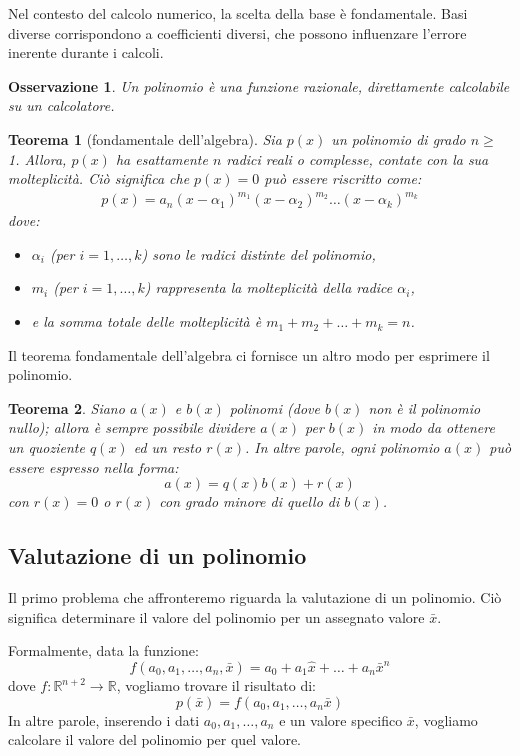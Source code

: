 \documentclass{article}
\newtheorem*{theorem}{\color{green}\textbf{Teorema}}
\newtheorem*{oss}{Osservazione}
\numberwithin{equation}{section}
\begin{document}
Nel contesto del calcolo numerico, la scelta della base è fondamentale. Basi
diverse corrispondono a coefficienti diversi, che possono influenzare l'errore
inerente durante i calcoli.
\begin{oss}
    Un polinomio è una funzione razionale, direttamente calcolabile su un
    calcolatore.
\end{oss}
\begin{theorem}[fondamentale dell'algebra]
    Sia $p(x)$ un polinomio di grado $n  \geq$ 1. Allora, $p(x)$ ha 
    esattamente $n$ radici reali o complesse, contate con la sua
    molteplicità. Ciò significa che $p(x)=0$ può essere riscritto come:
    \begin{equation}
        \begin{aligned} \label{eq:teorema_divisione_polinomi}
           p(x)=a_n(x-\alpha_1)^{m_1}(x-\alpha_2)^{m_2}\ldots(x-\alpha_k)^{m_k}
       \end{aligned} 
    \end{equation}
    dove:
    \begin{itemize}
        \item $\alpha_i$ (per $i=1,\ldots,k$) sono le radici distinte del polinomio,
       \item $m_i$ (per $i=1,\ldots,k$) rappresenta la molteplicità della radice
       $\alpha_i$,
       \item e la somma totale delle molteplicità è $m_1+m_2+\ldots+m_k=n$.
    \end{itemize}
\end{theorem}
Il teorema fondamentale dell'algebra ci fornisce un altro modo per esprimere
il polinomio.
\begin{theorem}
    Siano $a(x)$ e $b(x)$ polinomi (dove $b(x)$ non è il polinomio nullo); 
    allora è sempre possibile dividere $a(x)$ per $b(x)$ in modo da ottenere
    un quoziente $q(x)$ ed un resto $r(x)$. In altre parole, ogni polinomio
    $a(x)$ può essere espresso nella forma: 
    $$a(x)=q(x)b(x)+r(x)$$
    con $r(x)=0$ o $r(x)$ con grado minore di quello di $b(x)$.
\end{theorem}
\subsection{Valutazione di un polinomio}
Il primo problema che affronteremo riguarda la valutazione di un polinomio.
Ciò significa determinare il valore del polinomio per un assegnato valore $\bar{x}$.

Formalmente, data la funzione:
$$f(a_0,a_1,\ldots,a_n,\bar{x})=a_0+a_1\hat{x}+\ldots+a_n\bar{x}^n$$
dove $f:\mathbb{R}^{n+2}\rightarrow \mathbb{R}$, vogliamo trovare il risultato
di:
$$p(\bar{x})=f(a_0,a_1,\ldots,a_n\bar{x})$$
In altre parole, inserendo i dati $a_0,a_1,\ldots,a_n$ e un valore specifico
$\bar{x}$, vogliamo calcolare il valore del polinomio per quel valore.
\end{document}
